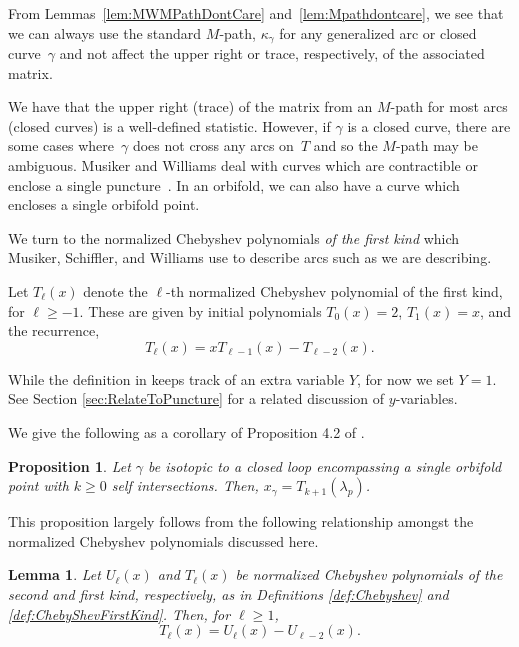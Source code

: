\documentclass[pdftex]{sigma}%
\numberwithin{equation}{section}
\newtheorem{Lemma}[Theorem]{Lemma}
\newtheorem{Proposition}[Theorem]{Proposition}
\begin{document}
From Lemmas~\ref{lem:MWMPathDontCare} and~\ref{lem:Mpathdontcare}, we see that we can always use the standard $M$-path, $\kappa_\gamma$ for any generalized arc or closed curve~$\gamma$ and not affect the upper right or trace, respectively, of the associated matrix.

We have that the upper right (trace) of the matrix from an $M$-path for most arcs (closed curves) is a well-defined statistic. However, if $\gamma$ is a closed curve, there are some cases where~$\gamma$ does not cross any arcs on~$T$ and so the $M$-path may be ambiguous. Musiker and Williams deal with curves which are contractible or enclose a single puncture~\cite{MW}. In an orbifold, we can also have a curve which encloses a single orbifold point.

 We turn to the normalized Chebyshev polynomials \emph{of the first kind} which Musiker, Schiffler, and Williams use to describe arcs such as we are describing.

\begin{Definition}\label{def:ChebyShevFirstKind}
Let $T_\ell(x)$ denote the $\ell$-th norma\-lized Chebyshev polynomial of the first kind, for $\ell \geq -1$. These are given by initial polynomials $T_{0}(x) = 2$, $T_1(x) = x$, and the recurrence,
\[
T_\ell(x) = xT_{\ell-1}(x) - T_{\ell-2}(x).
\]
\end{Definition}

While the definition in \cite{MSW-bases} keeps track of an extra variable $Y$, for now we set $Y = 1$. See Section \ref{sec:RelateToPuncture} for a related discussion of $y$-variables.

We give the following as a corollary of Proposition 4.2 of \cite{MSW-bases}.

\begin{Proposition}\label{prop:MSWChebyshev}
Let $\gamma$ be isotopic to a closed loop encompassing a single orbifold point with $k\geq 0$ self intersections. Then, $x_\gamma = T_{k+1}(\lambda_p)$.
\end{Proposition}

This proposition largely follows from the following relationship amongst the normalized Chebyshev polynomials discussed here.

\begin{Lemma}\label{lem:RelatingChebyshev}
Let $U_\ell(x)$ and $T_\ell(x)$ be normalized Chebyshev polynomials of the second and first kind, respectively, as in Definitions {\rm \ref{def:Chebyshev}} and {\rm \ref{def:ChebyShevFirstKind}}. Then, for $\ell \geq 1$, \[
T_\ell(x) = U_\ell(x) - U_{\ell-2}(x).
\]
\end{Lemma}
\end{document}
